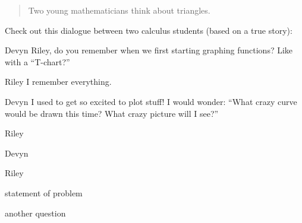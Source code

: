 \documentclass{ximera}
\title[Break-Ground:]{}
\begin{document}
\begin{abstract}
  Two young mathematicians think about triangles.
\end{abstract}
\maketitle

Check out this dialogue between two calculus students (based on a true
story):

\begin{dialogue}
\item[Devyn] Riley, do you remember when we first starting graphing
  functions? Like with a ``T-chart?''
\item[Riley] I remember everything.
\item[Devyn] I used to get so excited to plot stuff! I would wonder:
  ``What crazy curve would be drawn this time? What crazy picture will
  I see?''
\item[Riley] 
\item[Devyn] 
\item[Riley] 
\end{dialogue}

\begin{problem}
  statement of problem
   \begin{multipleChoice}
  \end{multipleChoice}
\end{problem}



\begin{problem}
   another question
    \begin{multipleChoice}
  \end{multipleChoice}
\end{problem}




\end{document}
